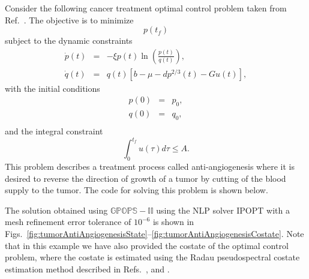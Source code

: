 \documentclass[10pt]{article}
\newenvironment{shadedframe}{%
  \def\FrameCommand{\fcolorbox{black}{shadecolor}}%
  \MakeFramed {\FrameRestore}}
{\endMakeFramed}
\begin{document}
Consider the following cancer treatment optimal control problem taken
from Ref.~.  The objective is to minimize
\begin{equation}\label{tumorCost}
  p(t_f)
\end{equation}
subject to the dynamic constraints
\begin{equation}\label{tumorDynamics}
  \begin{array}{lcl}
    \dot{p}(t) & = & -\xi p(t) \ln\left(\frac{p(t)}{q(t)}\right), \\
    \dot{q}(t) & = & q(t) \left[ b - \mu - d p^{2/3}(t) - Gu(t) \right],
 \end{array}
\end{equation}
with the initial conditions
\begin{equation} \label{tumorICs}
\begin{array}{lcl}
  p(0) & = & p_0, \\
  q(0) & = & q_0, \\
  \end{array}
\end{equation}
and the integral constraint
\begin{equation}\label{tumorIntegral}
  \int_0^{t_f} u(\tau) d\tau \leq A.
\end{equation}
This problem describes a treatment process called anti-angiogenesis
where it is desired to reverse the direction of growth of a tumor by
cutting of the blood supply to the tumor.  The code for solving this
problem is shown below. 
\begin{shadedframe}



\end{shadedframe} 
The solution obtained using $\mathbb{GPOPS-II}$ using the NLP solver
IPOPT with a mesh refinement error tolerance of $10^{-6}$ is shown in
Figs.~\ref{fig:tumorAntiAngiogenesisState}--\ref{fig:tumorAntiAngiogenesisCostate}.
Note that in this example we have also provided the costate of the
optimal control problem, where the costate is estimated using the
Radau pseudospectral costate estimation method described in
Refs.~, and .
\end{document}
